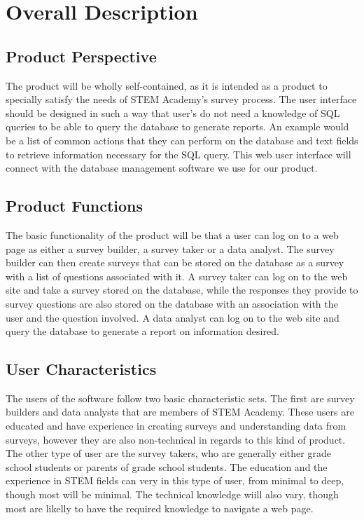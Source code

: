 \documentclass[letterpaper,10pt,titlepage, draftclsnofoot,onecolumn]{IEEEtran}
\begin{document}
\section{Overall Description}

\subsection{Product Perspective}
The product will be wholly self-contained, as it is intended as a product to specially satisfy the needs of STEM Academy's survey
process. The user interface should be designed in such a way that user's do not need a knowledge of SQL queries to be able
to query the database to generate reports. An example would be a list of common actions that they can perform on the database
and text fields to retrieve information necessary for the SQL query. This web user interface will connect with the database management
software we use for our product.
\subsection{Product Functions}
The basic functionality of the product will be that a user can log on to a web page as either a survey builder,
a survey taker or a data analyst. The survey builder can then create surveys that can be stored on the database as a survey with a
list of questions associated with it. A survey taker can log on to the web site and take a survey stored on the database,
while the responses they provide to survey questions are also stored on the database with an association with the user
and the question involved. A data analyst can log on to the web site and query the database to generate a report on
information desired.
\subsection{User Characteristics}
The users of the software follow two basic characteristic sets. The first are survey builders and data analysts that are members of
STEM Academy. These users are educated and have experience in creating surveys and understanding data from surveys,
however they are also non-technical in regards to this kind of product. The other type of user are the survey takers, who are
generally either grade school students or parents of grade school students. The education and the experience in STEM fields
can very in this type of user, from minimal to deep, though most will be minimal. The technical knowledge wiill also vary, though
most are likelly to have the required knowledge to navigate a web page.
\end{document}
